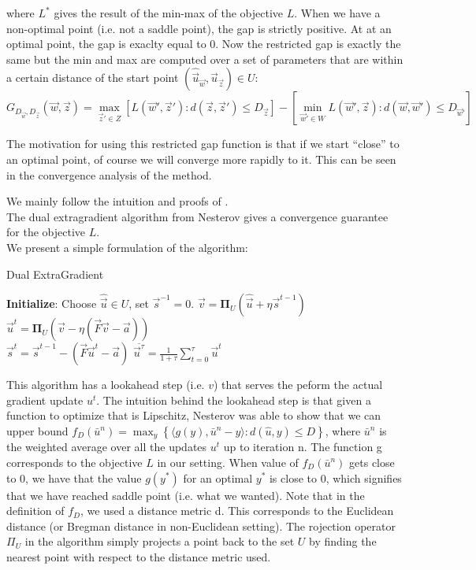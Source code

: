 where ${L}^*$ gives the result of the min-max of the objective
${L}$. When we have a non-optimal point (i.e. not a saddle point), the
gap is strictly positive. At at an optimal point, the gap is exaclty equal to 0.
Now the restricted gap is exactly the same but the min and max are computed over
a set of parameters that are within a certain distance of the start point
$(\hat{\vec u}_{\vec w},\hat{\vec u}_{\vec z}) \in {U}$:
\begin{equation}
  {G}_{D_{\vec w}, D_{\vec z}}(\vec w, \vec z) = \max_{\vec z' \in
{Z}} \left[ {L}(\vec w', \vec z') : d(\vec z, \vec z') \leq
D_{\vec z} \right] - \left [ \min_{\vec w' \in {W}} {L}(\vec w',
\vec z) : d(\vec w, \vec w') \leq D_{\vec w'} \right ]
\end{equation}

The motivation for using this restricted gap function is that if we start
``close'' to an optimal point, of course we will converge more rapidly to it.
This can be seen in the convergence analysis of the method.






We mainly follow the intuition and proofs of
\cite{taskarStructuredPredictionDual2006}.\\
The dual extragradient algorithm from Nesterov gives a convergence guarantee for
the objective ${L}$.\\
We present a simple formulation of the algorithm:
\begin{algorithm}
  \caption{Dual ExtraGradient}
  \label{alg:extra}
\begin{algorithmic}
  \STATE \textbf{Initialize}: Choose $\hat{\vec u} \in {U}$, set $\vec s^{-1} = 0$.
  \STATE $\vec v = \mathbf{\Pi}_{{U}}(\hat{\vec u} + \eta \vec s^{t-1})$\\
  \STATE $\vec u^t = \mathbf{\Pi}_{{U}}(\vec v - \eta (\vec F \vec v - \vec a))$\\
  \STATE $\vec s^t =  \vec s^{t-1} - (\vec F \vec u^t - \vec a)$
  \ENDFOR
  \RETURN $\overline{\vec u^{\tau}} = \frac{1}{1 + \tau} \sum_{t=0}^{\tau} \vec u^t$
\end{algorithmic}
\end{algorithm}

This algorithm has a lookahead step (i.e. $v$) that serves the peform the actual
gradient update $u^t$. The intuition behind the lookahead step is that given a
function to optimize that is Lipschitz, Nesterov was able to show that we can
upper bound $f_{D}(\bar{u}^n) = \max_y \left \{ \langle g(y),\bar{u}^n - y
\rangle : d(\hat{u},y) \leq D \right \}$, where $\bar{u}^n$ is the weighted
average over all the updates $u^t$ up to iteration n. The function g corresponds
to the objective ${L}$ in our setting. When value of $f_D(\bar{u}^n)$ gets close
to 0, we have that the value $g(y^*)$ for an optimal $y^*$ is close to 0, which
signifies that we have reached saddle point (i.e. what we wanted). Note that in
the definition of $f_D$, we used a
distance metric d. This corresponds to the Euclidean distance (or Bregman
distance in non-Euclidean setting). The rojection operator $\Pi_{{U}}$ in the
algorithm simply projects a point back to the set ${U}$ by finding the nearest
point with respect to the distance metric used.

